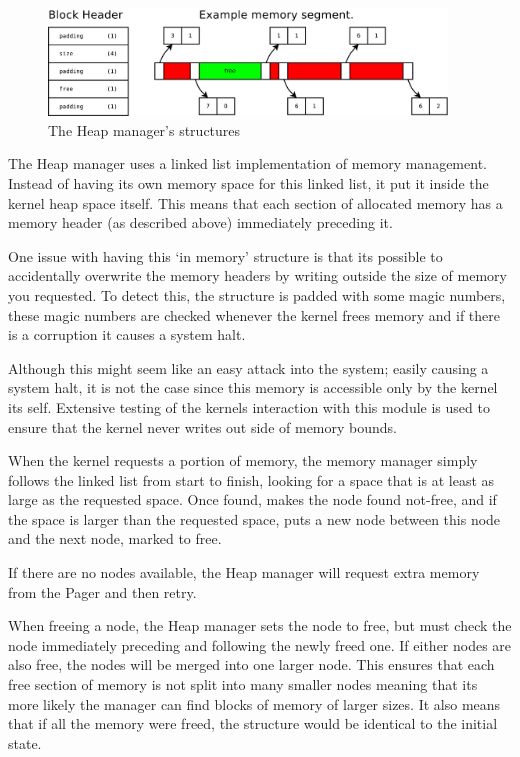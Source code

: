 \documentclass[a4paper]{report}
\begin{document}
\begin{figure}[ht]
\centering
\includegraphics[width=400px]{images/Heap_Manager}
\caption{The Heap manager's structures}
\label{fig:WinTitleBarScreen}
\end{figure}

The Heap manager uses a linked list implementation of memory management. Instead of having its own memory space for this linked list, it put it inside the kernel heap space itself. This means that each section of allocated memory has a memory header (as described above) immediately preceding it.

One issue with having this `in memory' structure is that its possible to accidentally overwrite the memory headers by writing outside the size of memory you requested. To detect this, the structure is padded with some magic numbers, these magic numbers are checked whenever the kernel frees memory and if there is a corruption it causes a system halt.

Although this might seem like an easy attack into the system; easily causing a system halt, it is not the case since this memory is accessible only by the kernel its self. Extensive testing of the kernels interaction with this module is used to ensure that the kernel never writes out side of memory bounds.

When the kernel requests a portion of memory, the memory manager simply follows the linked list from start to finish, looking for a space that is at least as large as the requested space. Once found, makes the node found not-free, and if the space is larger than the requested space, puts a new node between this node and the next node, marked to free.

If there are no nodes available, the Heap manager will request extra memory from the Pager and then retry.

When freeing a node, the Heap manager sets the node to free, but must check the node immediately preceding and following the newly freed one. If either nodes are also free, the nodes will be merged into one larger node. This ensures that each free section of memory is not split into many smaller nodes meaning that its more likely the manager can find blocks of memory of larger sizes. It also means that if all the memory were freed, the structure would be identical to the initial state.
\end{document}
